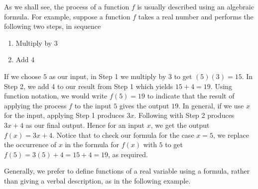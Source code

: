 \medskip

As we shall see, the process of a function $f$ is usually described using an algebraic formula. For example, suppose a function $f$ takes a real number and performs the following two steps, in sequence

\begin{enumerate}

\item  Multiply by 3

\item  Add 4

\end{enumerate}

If we choose $5$ as our input,  in Step 1 we multiply by $3$ to get $(5)(3) = 15$.  In Step 2, we add 4 to our result from Step 1 which yields $15 + 4 = 19$.  Using function notation, we would write  $f(5) = 19$ to indicate that the result of applying the process $f$ to the input $5$ gives the output $19$.  In general, if we use $x$ for the input, applying Step 1 produces $3x$.  Following with Step 2 produces $3x+4$ as our final output.  Hence for an input $x$, we get the output $f(x) = 3x + 4$.  Notice that to check our formula for the case $x=5$, we replace the occurrence of $x$ in the formula for $f(x)$ with $5$ to get $f(5) = 3(5) + 4 = 15 + 4 = 19$, as required.


\medskip

Generally, we prefer to define functions of a real variable using a formula, rather than giving a verbal description, as in the following example.\\

